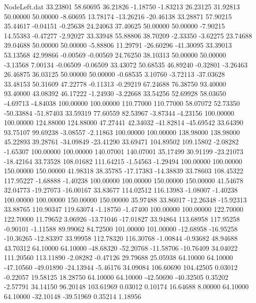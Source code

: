 \begin{filecontents}{NodeLeft.dat}
  33.23801   58.60695   36.21826    -1.18750   -1.83213   26.23125   31.92813   50.00000   50.00000   -8.60695   13.78174  -13.26216  -20.46138
  33.28871   57.90215   35.44617    -0.04151   -0.25638   24.24063   37.40625   50.00000   50.00000   -7.90215   14.55383   -0.47277   -2.92027
  33.33948   55.88806   38.70209    -2.33350   -3.62275   23.74688   39.04688   50.00000   50.00000   -5.88806   11.29791  -26.60296  -41.30095
  33.39013   53.13568   42.99866    -0.00569   -0.00569   24.76250   38.10313   50.00000   50.00000   -3.13568    7.00134   -0.06509   -0.06509
  33.43072   50.68535   46.89240    -0.32801   -3.26463   26.46875   36.03125   50.00000   50.00000   -0.68535    3.10760   -3.72113  -37.03628
  33.48153   50.31609   47.22778    -0.11313   -0.29219   67.24688   76.38750   93.40000   93.40000   43.08392   46.17222   -1.24930   -3.22668
  33.54256   52.69928   58.03650    -4.69713   -4.84038  100.00000  100.00000  110.77000  110.77000   58.07072   52.73350  -50.33884  -51.87403
  33.59319   77.60559   82.53967    -3.87344   -4.23156  100.00000  100.00000  124.88000  124.88000   47.27441   42.34032  -41.82814  -45.69542
  33.64390   93.75107   99.69238    -3.08557   -2.11863  100.00000  100.00000  138.98000  138.98000   45.22893   39.28761  -34.09849  -23.41290
  33.69471  104.89502  109.15802    -2.08282   -1.65307  100.00000  100.00000  140.07001  140.07001   35.17499   30.91199  -23.21073  -18.42164
  33.73528  108.01682  111.64215    -1.54563   -1.29494  100.00000  100.00000  150.00000  150.00000   41.98318   38.35785  -17.17383  -14.38839
  33.78603  108.45322  117.95227    -1.68888   -1.40238  100.00000  100.00000  150.00000  150.00000   41.54678   32.04773  -19.27073  -16.00167
  33.83677  114.02512  116.13983    -1.08007   -1.40238  100.00000  100.00000  150.00000  150.00000   35.97488   33.86017  -12.26348  -15.92313
  33.88765  110.90347  119.63074    -1.18750   -1.47400  100.00000  100.00000  122.70000  122.70000   11.79652    3.06926  -13.71046  -17.01827
  33.94864  113.68958  117.95258    -0.90101   -1.11588   89.99062   84.72500  101.00000  101.00000  -12.68958  -16.95258  -10.36265  -12.83397
  33.99958  112.78320  116.30768    -1.00844   -0.93682   48.94688   43.70312   64.10000   64.10000  -48.68320  -52.20768  -11.58706  -10.76409
  34.04022  111.20560  113.11890    -2.08282   -0.47126   29.79688   25.05938   64.10000   64.10000  -47.10560  -49.01890  -24.13944   -5.46176
  34.09084  106.60690  104.42505     0.03012   -0.22057   19.58125   18.28750   64.10000   64.10000  -42.50690  -40.32505    0.35202   -2.57791
  34.14150   96.20148  103.61969     0.03012    0.10174   16.64688    8.00000   64.10000   64.10000  -32.10148  -39.51969    0.35214    1.18956

\end{filecontents}
